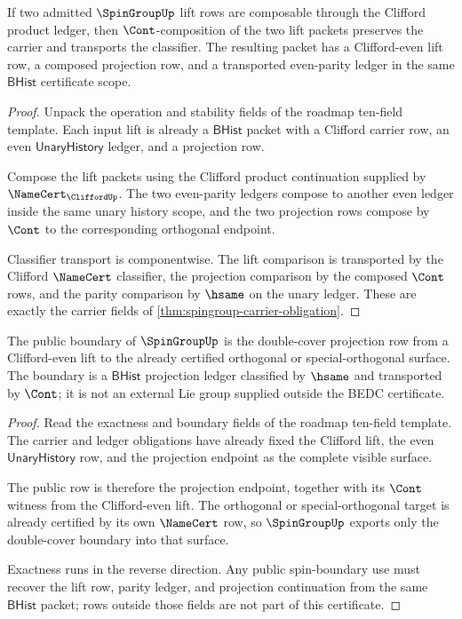 \begin{theorem}\label{thm:spingroup-concrete-lift-closure}
If two admitted $\SpinGroupUp$ lift rows are composable through the Clifford product ledger, then $\Cont$-composition of the two lift packets preserves the carrier and transports the classifier. The resulting packet has a Clifford-even lift row, a composed projection row, and a transported even-parity ledger in the same $\mathsf{BHist}$ certificate scope.
\end{theorem}
\begin{proof}
Unpack the operation and stability fields of the roadmap ten-field template. Each input lift is already a $\mathsf{BHist}$ packet with a Clifford carrier row, an even $\mathsf{UnaryHistory}$ ledger, and a projection row.

Compose the lift packets using the Clifford product continuation supplied by $\NameCert_{\CliffordUp}$. The two even-parity ledgers compose to another even ledger inside the same unary history scope, and the two projection rows compose by $\Cont$ to the corresponding orthogonal endpoint.

Classifier transport is componentwise. The lift comparison is transported by the Clifford $\NameCert$ classifier, the projection comparison by the composed $\Cont$ rows, and the parity comparison by $\hsame$ on the unary ledger. These are exactly the carrier fields of \autoref{thm:spingroup-carrier-obligation}.
\end{proof}

\begin{theorem}\label{thm:spingroup-spin-double-cover-boundary}
The public boundary of $\SpinGroupUp$ is the double-cover projection row from a Clifford-even lift to the already certified orthogonal or special-orthogonal surface. The boundary is a $\mathsf{BHist}$ projection ledger classified by $\hsame$ and transported by $\Cont$; it is not an external Lie group supplied outside the BEDC certificate.
\end{theorem}
\begin{proof}
Read the exactness and boundary fields of the roadmap ten-field template. The carrier and ledger obligations have already fixed the Clifford lift, the even $\mathsf{UnaryHistory}$ row, and the projection endpoint as the complete visible surface.

The public row is therefore the projection endpoint, together with its $\Cont$ witness from the Clifford-even lift. The orthogonal or special-orthogonal target is already certified by its own $\NameCert$ row, so $\SpinGroupUp$ exports only the double-cover boundary into that surface.

Exactness runs in the reverse direction. Any public spin-boundary use must recover the lift row, parity ledger, and projection continuation from the same $\mathsf{BHist}$ packet; rows outside those fields are not part of this certificate.
\end{proof}


